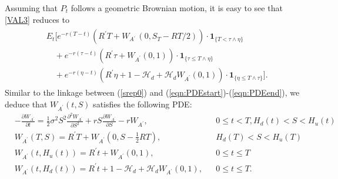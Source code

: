 \documentclass[draft, noinfoline]{ectaart}
\numberwithin{equation}{section}
\theoremstyle{plain}
\newcommand{\Ap}{A\ensuremath{^\prime}~}
\begin{document}
Assuming that $P_t$ follows a geometric Brownian motion, it is easy to see that \eqref{VAL3} reduces to
\begin{align*}
\begin{split} ~& E_{t}\Bigg[e^{-r(T-t)}(R^\prime T+W_{\Ap}(0,S_T-RT/2))\cdot\mathbf{1}_{\{T<\tau\land\eta\}}\\
&\quad+e^{-r(\tau-t)}(R^\prime\tau+W_{A^\prime}(0,1))\cdot\mathbf{1}_{\{\tau\le T\land\eta\}}\\
 & \quad+e^{-r(\eta-t)}\left(R^\prime\eta+1-\mathcal{H}_d+\mathcal{H}_d W_{A^\prime}(0,1)\right)\cdot\mathbf{1}_{\{\eta\le T\land\tau\}}\Bigg].
\end{split}
\end{align*}
Similar to the linkage between (\ref{srep0}) and (\ref{eqn:PDEstart})-(\ref{eqn:PDEend}), we deduce that $W_{A^\prime}(t,S)$ satisfies the following PDE:
\begin{align*}
&-\frac{\partial W_{A^\prime}}{\partial t}  =\frac{1}{2}\sigma^{2}S^{2}\frac{\partial^{2}W_{A^\prime}}{\partial S^{2}}
   +r S\frac{\partial W_{A^\prime}}{\partial S}-r W_{A^\prime}, &&0\le t<T, H_d(t)<S<H_u(t)\\
&W_{A^\prime}(T,S)  =R^\prime T+W_{A^\prime}(0,S-\frac{1}{2}RT),&&H_d(T)<S<H_u(T)\\
&W_{A^\prime}(t,H_{u}(t))  =R^\prime t+W_{A^\prime}(0,1),&&0\le t\le T\\
&W_{A^\prime}(t,H_d(t))  =R^\prime t+1-\mathcal{H}_{d}+\mathcal{H}_{d}W_{A^\prime}(0,1),&&0\le t\le T.
\end{align*}



\end{document}
